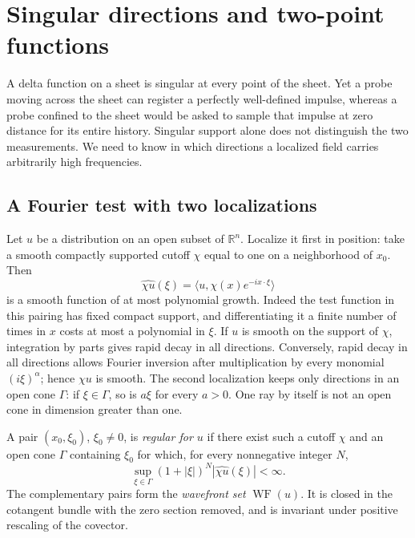 \chapter{Singular directions and two-point functions}\label{f:microlocal}

A delta function on a sheet is singular at every point of the sheet. Yet a
probe moving across the sheet can register a perfectly well-defined impulse,
whereas a probe confined to the sheet would be asked to sample that impulse
at zero distance for its entire history. Singular support alone does not
distinguish the two measurements. We need to know in which directions a
localized field carries arbitrarily high frequencies.

\section{A Fourier test with two localizations}
Let $u$ be a distribution on an open subset of $\mathbb R^n$. Localize it
first in position: take a smooth compactly supported cutoff $\chi$ equal to
one on a neighborhood of $x_0$. Then
\[
  \widehat{\chi u}(\xi)=\langle u,\chi(x)e^{-ix\cdot\xi}\rangle
\]
is a smooth function of at most polynomial growth. Indeed the test function
in this pairing has fixed compact support, and differentiating it a finite
number of times in $x$ costs at most a polynomial in $\xi$. If $u$ is
smooth on the support of $\chi$, integration by parts gives rapid decay in
all directions. Conversely, rapid decay in all directions allows Fourier
inversion after multiplication by every monomial $(i\xi)^\alpha$; hence
$\chi u$ is smooth. The second localization keeps only directions in an
open cone $\Gamma$: if $\xi\in\Gamma$, so is $a\xi$ for every $a>0$.
One ray by itself is not an open cone in dimension greater than one.

\begin{definition}\label{f:wf-test}
A pair $(x_0,\xi_0)$, $\xi_0\ne0$, is \emph{regular for $u$} if there
exist such a cutoff $\chi$ and an open cone $\Gamma$ containing $\xi_0$
for which, for every nonnegative integer $N$,
\begin{equation}
 \sup_{\xi\in\Gamma}(1+|\xi|)^N|\widehat{\chi u}(\xi)|<\infty .
 \label{f:wf-decay}
\end{equation}
The complementary pairs form the \emph{wavefront set} $\operatorname{WF}(u)$.
It is closed in the cotangent bundle with the zero section removed, and
is invariant under positive rescaling of the covector.
\end{definition}

